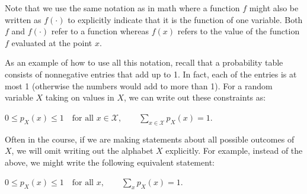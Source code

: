 \documentclass[6008notes.tex]{subfiles}
\begin{document}
Note that we use the same notation as in math where a function $f$ might also be written as $f(\cdot )$ to explicitly indicate that it is the function of one variable. Both $f$ and $f(\cdot )$ refer to a function whereas $f(x)$ refers to the value of the function $f$ evaluated at the point $x$.

As an example of how to use all this notation, recall that a probability table consists of nonnegative entries that add up to 1. In fact, each of the entries is at most 1 (otherwise the numbers would add to more than 1). For a random variable $X$ taking on values in $X$, we can write out these constraints as:

{\centering$0 \le p_ X(x) \le 1\quad \text {for all }x\in \mathcal{X}, \qquad \sum _{x \in \mathcal{X}} p_ X(x) = 1.$ \par}
 
Often in the course, if we are making statements about all possible outcomes of $X$, we will omit writing out the alphabet $X$ explicitly. For example, instead of the above, we might write the following equivalent statement:

{\centering$0 \le p_ X(x) \le 1\quad \text {for all }x, \qquad \sum _ x p_ X(x) = 1.$ \par}
\end{document}
